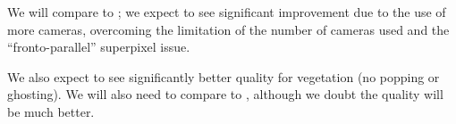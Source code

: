 We will compare to \cite{chaurasia13,ODD15}; we expect to see significant improvement due to
the use of more cameras, overcoming the limitation of the number of cameras used and the 
``fronto-parallel'' superpixel issue. 

We also expect to see significantly better quality for
vegetation (no popping or ghosting). We will also need to compare to \cite{dibr}, although we
doubt the quality will be much better. 
